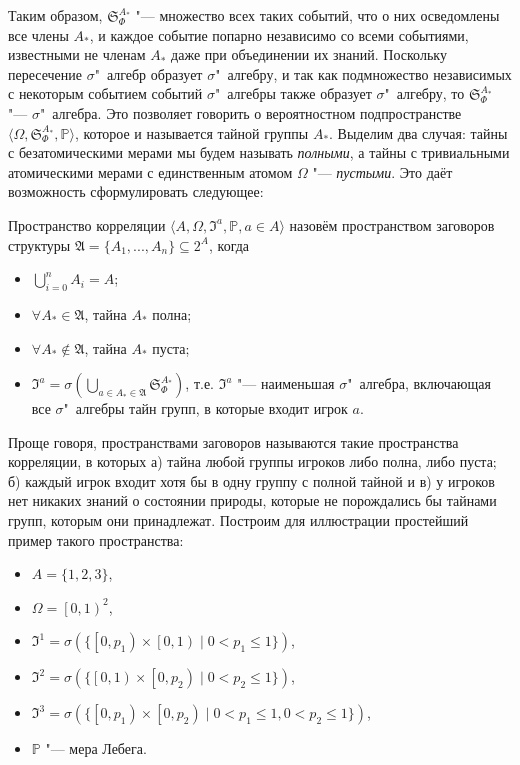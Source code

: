 Таким образом, $\mathfrak{S}_\Phi^{A_*}$ "--- множество всех таких событий, что о них осведомлены все члены $A_*$, и каждое событие попарно независимо со всеми событиями, известными не членам $A_*$ даже при объединении их знаний. Поскольку пересечение $\sigma$"~алгебр образует $\sigma$"~алгебру, и так как подмножество независимых с некоторым событием событий $\sigma$"~алгебры также образует $\sigma$"~алгебру, то $\mathfrak{S}_\Phi^{A_*}$ "--- $\sigma$"~алгебра. Это позволяет говорить о вероятностном подпространстве $\langle \Omega, \mathfrak{S}_\Phi^{A_*}, \mathbb{P} \rangle$, которое и называется тайной группы $A_*$. Выделим два случая: тайны с безатомическими мерами мы будем называть \emph{полными}, а тайны с тривиальными атомическими мерами с единственным атомом $\Omega$ "--- \emph{пустыми}. Это даёт возможность сформулировать следующее:
\begin{definition}
	Пространство корреляции $\langle A, \Omega, \mathfrak{I}^a, \mathbb{P}, a \in A \rangle$ назовём пространством заговоров структуры $\mathfrak{A} = \{A_1, ..., A_n\} \subseteq 2^A$, когда
	\begin{itemize}
		\item $\bigcup\limits_{i=0}^n A_i = A$;
		\item $\forall A_* \in \mathfrak{A}$, тайна $A_*$ полна;
		\item $\forall A_* \notin \mathfrak{A}$, тайна $A_*$ пуста;
		\item $\mathfrak{I}^a = \sigma(\bigcup\limits_{a \in A_* \in \mathfrak{A}}\mathfrak{S}_\Phi^{A_*})$, т.е. $\mathfrak{I}^a$ "--- наименьшая $\sigma$"~алгебра, включающая все $\sigma$"~алгебры тайн групп, в которые входит игрок $a$.
	\end{itemize}
\end{definition}

Проще говоря, пространствами заговоров называются такие пространства корреляции, в которых а) тайна любой группы игроков либо полна, либо пуста; б) каждый игрок входит хотя бы в одну группу с полной тайной и в) у игроков нет никаких знаний о состоянии природы, которые не порождались бы тайнами групп, которым они принадлежат. Построим для иллюстрации простейший пример такого пространства:
\begin{itemize}
	\item $A = \{1, 2, 3\}$,
	\item $\Omega = \left[0, 1\right)^2$,
	\item $\mathfrak{I}^1 = \sigma(\{\left[ 0, p_1 \right) \times \left[ 0, 1 \right) \mid 0 < p_1 \leq 1 \})$,
	\item $\mathfrak{I}^2 = \sigma(\{\left[ 0, 1 \right) \times \left[ 0, p_2 \right) \mid 0 < p_2 \leq 1 \})$,
	\item $\mathfrak{I}^3 = \sigma(\{\left[ 0, p_1 \right) \times \left[ 0, p_2 \right) \mid 0 < p_1 \leq 1, 0 < p_2 \leq 1 \})$,
	\item $\mathbb{P}$ "--- мера Лебега.
\end{itemize}

